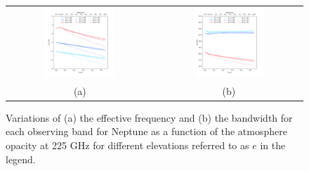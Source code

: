 \begin{figure}[ht!] %
\begin{center}
\begin{tabular}{cc}
\includegraphics[clip,trim={0, 1cm, 0,
  2cm},width=0.5\textwidth]{Figures/SpectralBands/nika2_centfreq.png}
& \includegraphics[clip,trim={0, 1cm, 0,
  2cm},width=0.5\textwidth]{Figures/SpectralBands/nika2_bandwidths.png}\\
(a) & (b) \\
\end{tabular}
\caption[Atmosphere effect on system transmission]{Variations of (a) the
  effective frequency and (b) the bandwidth for each observing band for Neptune
  as a function of the atmosphere opacity at 225 GHz for different
  elevations referred to as $e$ in the legend.  }  
 \label{fig:atmosphereimpact}
\end{center}
\end{figure}

 



